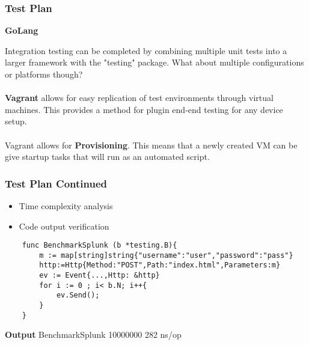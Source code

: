 \begin{frame}

\frametitle{Test Plan}
\textbf{GoLang}

Integration testing can be completed by combining multiple unit tests into a larger framework with the "testing" package. 
What about multiple configurations or platforms though?\\~\\

\textbf {Vagrant} allows for easy replication of test environments through virtual machines. This provides a method for plugin end-end testing for any device setup. \\~\\

Vagrant allows for \textbf{Provisioning}. This means that a newly created VM can be give startup tasks that will run as an automated script.

\end{frame}

\begin{frame}[fragile]
\frametitle{Test Plan Continued}
\begin{itemize} %
	\item Time complexity analysis
	\item Code output verification
	\end{itemize}

\begin{example} %
\begin{verbatim}
	func BenchmarkSplunk (b *testing.B){
		m := map[string]string{"username":"user","password":"pass"}
		http:=Http{Method:"POST",Path:"index.html",Parameters:m}
		ev := Event{...,Http: &http}
		for i := 0 ; i< b.N; i++{
			ev.Send();
		}
	}
\end{verbatim}
\end{example}
	\textbf{Output}
	BenchmarkSplunk    10000000    282 ns/op


\end{frame}

